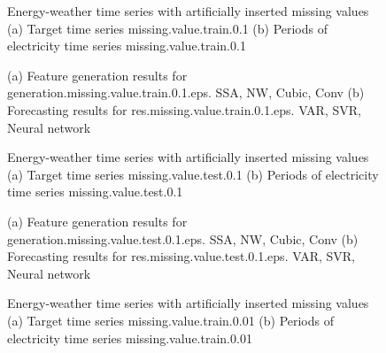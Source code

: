 \documentclass[12pt]{article}
\begin{document}
\begin{figure}
\centering
{}
\caption{Energy-weather time series with artificially inserted missing values	(a) Target time series	missing.value.train.0.1	(b) Periods of electricity time series	missing.value.train.0.1	}
\end{figure}


\begin{figure}
\centering
{}
\caption{(a)	Feature generation results for	generation.missing.value.train.0.1.eps.	SSA, NW, Cubic, Conv	(b)	Forecasting results for	res.missing.value.train.0.1.eps.	VAR, SVR, Neural network	}
\end{figure}


\begin{figure}
\centering
{}
\caption{Energy-weather time series with artificially inserted missing values	(a) Target time series	missing.value.test.0.1	(b) Periods of electricity time series	missing.value.test.0.1	}
\end{figure}


\begin{figure}
\centering
{}
\caption{(a)	Feature generation results for	generation.missing.value.test.0.1.eps.	SSA, NW, Cubic, Conv	(b)	Forecasting results for	res.missing.value.test.0.1.eps.	VAR, SVR, Neural network	}
\end{figure}


\begin{figure}
\centering
{}
\caption{Energy-weather time series with artificially inserted missing values	(a) Target time series	missing.value.train.0.01	(b) Periods of electricity time series	missing.value.train.0.01	}
\end{figure}
\end{document}

